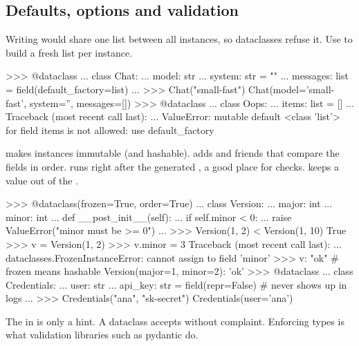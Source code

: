 \subsection{Defaults, options and validation}

\begin{trap}
Writing  would share one list between all instances, so dataclasses
refuse it. Use  to build a fresh list per instance.
\end{trap}

\begin{pycode}
>>> @dataclass
... class Chat:
...     model: str
...     system: str = ""
...     messages: list = field(default_factory=list)
...
>>> Chat("small-fast")
Chat(model='small-fast', system='', messages=[])
>>> @dataclass
... class Oops:
...     items: list = []
...
Traceback (most recent call last):
  ...
ValueError: mutable default <class 'list'> for field items is not allowed:
use default_factory
\end{pycode}

 makes instances immutable (and hashable).  adds
\code{<} and friends that compare the fields in order.  runs right after the
generated , a good place for checks.  keeps a value out of the
.

\begin{pycode}
>>> @dataclass(frozen=True, order=True)
... class Version:
...     major: int
...     minor: int
...     def __post_init__(self):
...         if self.minor < 0:
...             raise ValueError("minor must be >= 0")
...
>>> Version(1, 2) < Version(1, 10)
True
>>> v = Version(1, 2)
>>> v.minor = 3
Traceback (most recent call last):
  ...
dataclasses.FrozenInstanceError: cannot assign to field 'minor'
>>> {v: "ok"}                             # frozen means hashable
{Version(major=1, minor=2): 'ok'}
>>> @dataclass
... class Credentials:
...     user: str
...     api_key: str = field(repr=False)   # never shows up in logs
...
>>> Credentials("ana", "sk-secret")
Credentials(user='ana')
\end{pycode}

\begin{trap}
The  in  is only a hint. A dataclass accepts 
without complaint. Enforcing types is what validation libraries such as pydantic do.
\end{trap}

